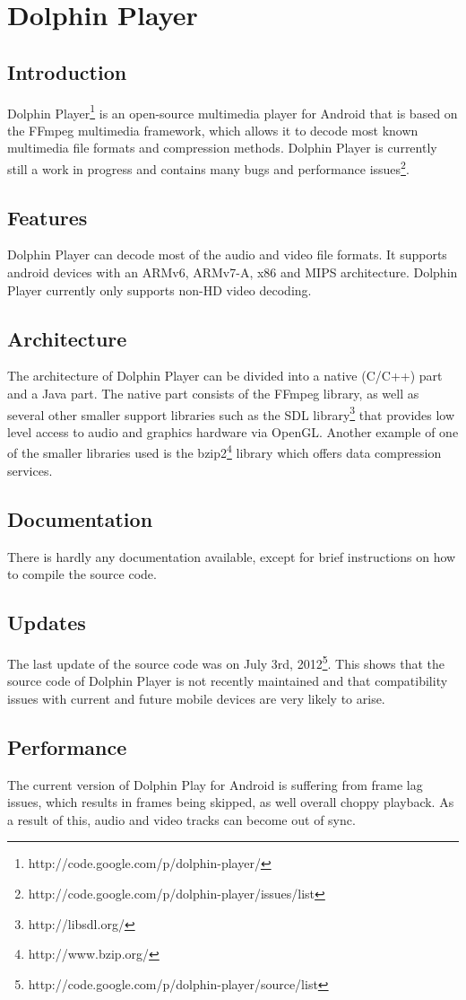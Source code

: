 \section{Dolphin Player}
\subsection{Introduction}
Dolphin Player\footnote{http://code.google.com/p/dolphin-player/} is an open-source multimedia player for Android that is based on the FFmpeg multimedia framework, which allows it to decode most known multimedia file formats and compression methods. Dolphin Player is currently still a work in progress and contains many bugs and performance issues\footnote{http://code.google.com/p/dolphin-player/issues/list}.
\subsection{Features}
Dolphin Player can decode most of the audio and video file formats. It supports android devices with an ARMv6, ARMv7-A, x86 and MIPS architecture. Dolphin Player currently only supports non-HD video decoding.
\subsection{Architecture}
The architecture of Dolphin Player can be divided into a native (C/C++) part and a Java part. The native part consists of the FFmpeg library, as well as several other smaller support libraries such as the SDL library\footnote{http://libsdl.org/} that provides low level access to audio and graphics hardware via OpenGL. Another example of one of the smaller libraries used is the bzip2\footnote{http://www.bzip.org/} library which offers data compression services.
\subsection{Documentation}
There is hardly any documentation available, except for brief instructions on how to compile the source code.
\subsection{Updates}
The last update of the source code was on July 3rd, 2012\footnote{http://code.google.com/p/dolphin-player/source/list}. This shows that the source code of Dolphin Player is not recently maintained and that compatibility issues with current and future mobile devices are very likely to arise.
\subsection{Performance}
The current version of Dolphin Play for Android is suffering from frame lag issues, which results in frames being skipped, as well overall choppy playback. As a result of this, audio and video tracks can become out of sync.


